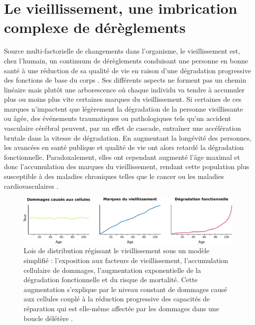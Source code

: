 \section{Le vieillissement, une imbrication complexe de dérèglements}


Source multi-factorielle de changements dans l'organisme, le vieillissement est, chez l'humain, un continuum de dérèglements conduisant une personne en bonne santé à une réduction de sa qualité de vie en raison d'une dégradation progressive des fonctions de base du corps \cite{Berrut2013}. Ses différents aspects ne forment pas un chemin linéaire mais plutôt une arborescence où chaque individu va tendre à accumuler plus ou moins plus vite certaines marques du vieillissement. Si certaines de ces marques n'impactent que légèrement la dégradation de la personne vieillissante ou âgée, des événements traumatiques ou pathologiques tels qu'un accident vasculaire cérébral peuvent, par un effet de cascade, entraîner une accélération brutale dans la vitesse de dégradation. En augmentant la longévité des personnes, les avancées en santé publique et qualité de vie ont alors retardé la dégradation fonctionnelle. Paradoxalement, elles ont cependant augmenté l'âge maximal et donc l'accumulation des marques du vieillissement, rendant cette population plus susceptible à des maladies chroniques telles que le cancer ou les maladies cardiovasculaires \cite{Khan2017Aug}. 

\begin{figure}
    \centering
    \includegraphics[width=\textwidth]{img/intro/4_aging/intro_4_aging_rate_marks.pdf}
    \caption[Lois de distribution régissant le vieillissement sous un modèle simplifié]{Lois de distribution régissant le vieillissement sous un modèle simplifié : l'exposition aux facteurs de vieillissement, l'accumulation cellulaire de dommages, l'augmentation exponentielle de la dégradation fonctionnelle et du risque de mortalité. Cette augmentation s'explique par le niveau constant de dommages causé aux cellules couplé à la réduction progressive des capacités de réparation qui est elle-même affectée par les dommages dans une boucle délétère \cite{Todhunter2018}.}
    \label{fig:aging_rate_marks}
\end{figure}

